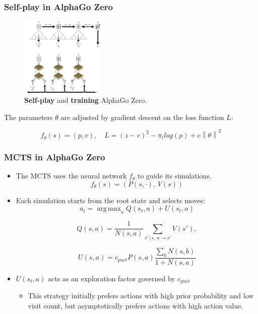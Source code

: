 \documentclass[9pt]{beamer}
\DeclareMathOperator*{\argmax}{arg\,max}
\newcommand{\norm}[1]{\left\lVert#1\right\rVert}
\begin{document}
\begin{frame}
	\frametitle{Self-play in AlphaGo Zero}
		
	\begin{figure}[H]
		\centering
		\includegraphics[width=4cm]{alpha_go_zero_training.png}
		
		\caption{
			\textbf{Self-play} and \textbf{training} AlphaGo Zero.\cite{Silver_2016}
			}
		\label{fig:alpha-zero-self_play}
	\end{figure}
	
	The parameters $\theta$ are adjusted by gradient descent on the loss function $L$:

	\begin{equation}
		f_\theta(s) = (p,v),\quad L = (z-v)^2 - \pi_t log(p) + c \norm{\theta}^2
	\end{equation}
\end{frame}


\begin{frame}
	\frametitle{MCTS in AlphaGo Zero}
	\begin{itemize}
	\item The MCTS uses the neural network $f_\theta$ to guide its simulations.
	$$f_\theta(s) = (P(s, \cdot), \, V(s))$$
		
	
	\item Each simulation starts from the root state and selects moves:
	\begin{equation}
		a_t  = \argmax_a{Q(s_t,a) + U(s_t,a)}
	\end{equation}

	\begin{equation}
		Q(s, a) = \frac{1}{N(s,a)} \sum_{s'\, | \, s,\, a \rightarrow s'}{V(s')},
	\end{equation}

	\begin{equation}
		U(s, a) = c_{puct}P(s, a)\frac{\sum_b N(s,b)}{1+N(s,a)}
	\end{equation}

	\item $U(s_t,a)$ acts as an exploration factor governed by $c_{puct}$
	\begin{itemize}
		\item This strategy initially prefers actions with high prior probability and low visit count, but asymptotically prefers actions with high action value.
	\end{itemize}
	\end{itemize}
\end{frame}
\end{document}
